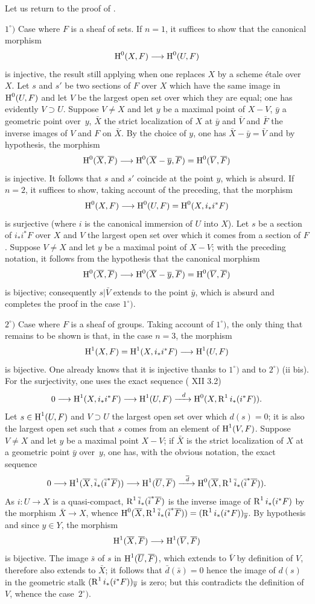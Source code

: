 Let us return to the proof of .

$1^\circ)$ Case where $F$ is a sheaf of sets. If $n=1$, it suffices to show that the canonical morphism
$$
\H^0(X, F)\to \H^0(U, F)$$
is injective, the result still applying when one replaces $X$ by a scheme \'etale over $X$. Let $s$ and $s'$ be two sections of $F$ over $X$ which have the same image in $\operatorname{H}^0(U, F)$ and let $V$ be the largest open set over which they are equal; one has evidently $V\supset U$. Suppose $V\neq X$ and let $y$ be a maximal point of $X-V$, $\bar y$ a geometric point over~$y$, $\bar X$ the strict localization of $X$ at $\bar y$ and $\bar V$ and $\bar F$ the inverse images of $V$ and $F$ on $\bar X$. By the choice of $y$, one has $\bar X-\bar y=\bar V$ and by hypothesis, the morphism
$$
\H^0(\bar X, \bar F)\to \H^0(\bar X-\bar y, \bar F)=\H^0(\bar V, \bar F)$$
is injective. It follows that $s$ and $s'$ coincide at the point $y$, which is absurd. If $n=2$, it suffices to show, taking account of the preceding, that the morphism
$$
\H^0(X, F)\to \H^0(U, F)=\H^0(X, i_*i^*F)$$
is surjective (where $i$ is the canonical immersion of $U$ into $X$). Let $s$ be a section of $i_*i^*F$ over $X$ and $V$ the largest open set over which it comes from a section of $F$. Suppose $V\neq X$ and let $y$ be a maximal point of $X-V$; with the preceding notation, it follows from the hypothesis that the canonical morphism
$$
\H^0(\bar X, \bar F)\to \H^0(\bar X-\bar y, \bar F)=\H^0(\bar V, \bar F)
$$
is bijective; consequently $s|\bar V$ extends to the point $\bar y$, which is absurd and completes the proof in the case $1^\circ)$.

$2^\circ)$ Case where $F$ is a sheaf of groups. Taking account of $1^\circ)$, the only thing that remains to be shown is that, in the case $n=3$, the morphism
$$
\H^1(X, F)=\H^1(X, i_*i^*F)\to \H^1(U, F)$$
is bijective. One already knows that it is injective thanks to $1^\circ)$ and to  $2^\circ)$ (ii bis). For the surjectivity, one uses the exact sequence ( XII 3.2)
$$
0\to \H^1(X, i_*i^*F)\to \H^1(U, F)\lto{d}\H^0(X, \R^1i_*(i^*F)).
$$
Let $s\in \operatorname{H}^1(U, F)$ and $V\supset U$ the largest open set over which $d(s)=0$; it is also the largest open set such that $s$ comes from an element of $\operatorname{H}^1(V, F)$. Suppose $V\neq X$ and let $y$ be a maximal point $X-V$; if $\bar X$ is the strict localization of $X$ at a geometric point $\bar y$ over~$y$, one has, with the obvious notation, the exact sequence
$$
0\to \H^1(\bar X, \bar i_*(\bar i^*\bar F))\to \H^1(\bar U, \bar F)\lto{\bar d}\H^0(\bar X, \R^1\bar i_*(\bar i^*\bar F)).
$$
As $i:U\to X$ is a quasi-compact, $\operatorname{R}^1\overline i_*(\overline i^*\overline F)$ is the inverse image of $\operatorname{R}^1i_*(i^*F)$ by the morphism $\bar X\to X$, whence $\operatorname{H}^0(\overline X, \operatorname{R}^1\overline i_*(\overline i^*\overline F))=(\operatorname{R}^1i_*(i^*F))_{\overline y}$. By hypothesis and since $y\in Y$, the morphism
$$
\H^1(\bar X, \bar F)\to \H^1(\bar V, \bar F)
$$
is bijective. The image $\bar s$ of $s$ in $\operatorname{H}^1(\overline U, \overline F)$, which extends to $\bar V$ by definition of $V$, therefore also extends to $\bar X$; it follows that $\bar d(\bar s)=0$ hence the image of $d(s)$ in the geometric stalk $(\operatorname{R}^1i_*(i^*F))_{\overline y}$ is zero; but this contradicts the definition of $V$, whence the case~$2^\circ)$.

